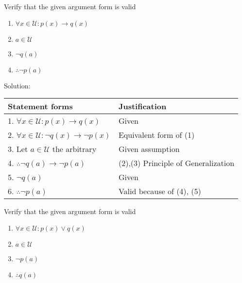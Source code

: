 \begin{bt} \end{bt}
\begin{bt} \end{bt}
\begin{bt} \end{bt}
\begin{bt} \end{bt}
\begin{bt} \end{bt}
\begin{longfbox}
    \begin{bt} \label{pro:practice2.29}
        Verify that the given argument form is valid
        \begin{enumerate}
            \item[] $\forall x \in \mathcal U: p(x) \rightarrow q(x)$
            \item[] $a \in \mathcal U$
            \item[] $\neg q(a)$
            \item[] $\therefore \neg p(a)$
        \end{enumerate}
    \end{bt}
\end{longfbox}

Solution:
\begin{table}[hbt!]
    \centering
    \begin{tabular}{|l | l|} 
    \hline
    Statement forms & Justification\\ [0.5ex] 
    \hline
        1. $\forall x \in \mathcal U: p(x) \rightarrow q(x)$ & Given \\
        2. $\forall x \in \mathcal U: \neg q(x) \rightarrow \neg p(x)$ & Equivalent form of (1) \\
        3. Let $a \in \mathcal U$ the arbitrary & Given assumption \\
        4. $\therefore \neg q(a) \rightarrow \neg p(a)$ & (2),(3) Principle of Generalization \\
        5. $\neg q(a)$ & Given \\
        6. $\therefore \neg p(a)$ & Valid because of (4), (5) \\
    \hline
    \end{tabular}
\end{table} 

\newpage
\begin{longfbox}
    \begin{bt} \label{pro:practice2.30}
        Verify that the given argument form is valid
        \begin{enumerate}
            \item[] $\forall x \in \mathcal U: p(x) \lor q(x)$
            \item[] $a \in \mathcal U$
            \item[] $\neg p(a)$
            \item[] $\therefore q(a)$
        \end{enumerate}
    \end{bt}
\end{longfbox}

